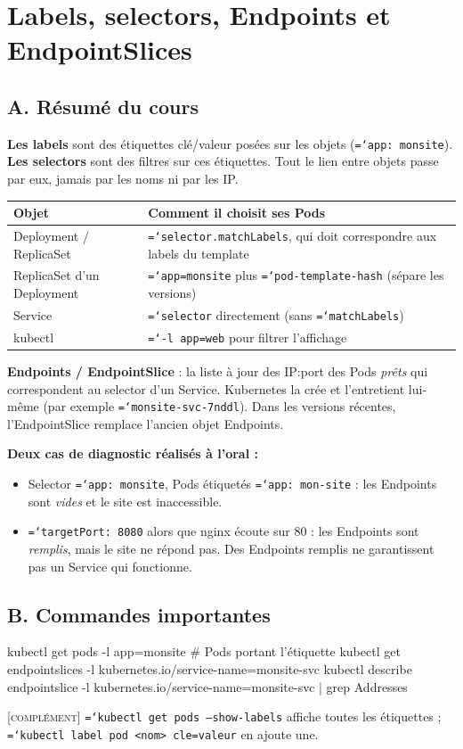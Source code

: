\documentclass[11pt,a4paper]{article}
\newcommand{\cmd}[1]{\texttt{\hyphenchar\font=`\-#1}}
\newcommand{\compl}{\textsc{[complément]}}
\newcommand{\partie}[1]{\needspace{9\baselineskip}\subsection*{#1}}
\begin{document}
\section{Labels, selectors, Endpoints et EndpointSlices}

\partie{A. Résumé du cours}
\textbf{Les labels} sont des étiquettes clé/valeur posées sur les objets (\cmd{app: monsite}). \textbf{Les selectors} sont des filtres sur ces étiquettes. Tout le lien entre objets passe par eux, jamais par les noms ni par les IP.
\begin{center}
\begin{tabularx}{\linewidth}{@{}lX@{}}
\toprule
\textbf{Objet} & \textbf{Comment il choisit ses Pods} \\
\midrule
Deployment / ReplicaSet & \cmd{selector.matchLabels}, qui doit correspondre aux labels du template \\
ReplicaSet d'un Deployment & \cmd{app=monsite} plus \cmd{pod-template-hash} (sépare les versions) \\
Service & \cmd{selector} directement (sans \cmd{matchLabels}) \\
kubectl & \cmd{-l app=web} pour filtrer l'affichage \\
\bottomrule
\end{tabularx}
\end{center}
\textbf{Endpoints / EndpointSlice} : la liste à jour des IP:port des Pods \emph{prêts} qui correspondent au selector d'un Service. Kubernetes la crée et l'entretient lui-même (par exemple \cmd{monsite-svc-7nddl}). Dans les versions récentes, l'EndpointSlice remplace l'ancien objet Endpoints.

\textbf{Deux cas de diagnostic réalisés à l'oral :}
\begin{itemize}
  \item Selector \cmd{app: monsite}, Pods étiquetés \cmd{app: mon-site} : les Endpoints sont \emph{vides} et le site est inaccessible.
  \item \cmd{targetPort: 8080} alors que nginx écoute sur 80 : les Endpoints sont \emph{remplis}, mais le site ne répond pas. Des Endpoints remplis ne garantissent pas un Service qui fonctionne.
\end{itemize}

\partie{B. Commandes importantes}
\begin{code}
kubectl get pods -l app=monsite                    # Pods portant l'étiquette
kubectl get endpointslices -l kubernetes.io/service-name=monsite-svc
kubectl describe endpointslice -l kubernetes.io/service-name=monsite-svc | grep Addresses
\end{code}
\compl{} \cmd{kubectl get pods --show-labels} affiche toutes les étiquettes ; \cmd{kubectl label pod <nom> cle=valeur} en ajoute une.
\end{document}
